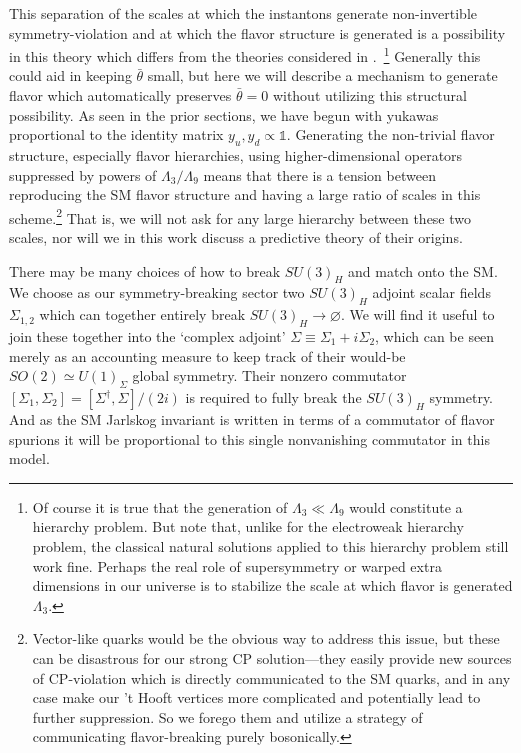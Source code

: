 \documentclass[11pt,a4paper]{article}
\begin{document}
This separation of the scales at which the instantons generate non-invertible symmetry-violation and at which the flavor structure is generated is a possibility in this theory which differs from the theories considered in \cite{Agrawal:2017evu,Agrawal:2017ksf}.~\footnote{Of course it is true that the generation of $\Lambda_3 \ll \Lambda_9$ would constitute a hierarchy problem. But note that, unlike for the electroweak hierarchy problem, the classical natural solutions applied to this hierarchy problem still work fine. Perhaps the real role of supersymmetry or warped extra dimensions in our universe is to stabilize the scale at which flavor is generated $\Lambda_3$.} 
Generally this could aid in keeping $\bar \theta$ small, but here we will describe a mechanism to generate flavor which automatically preserves $\bar \theta = 0$ without utilizing this structural possibility. 
As seen in the prior sections, we have begun with yukawas proportional to the identity matrix $y_u, y_d \propto \mathds{1}$. Generating the non-trivial flavor structure, especially flavor hierarchies, using higher-dimensional operators suppressed by powers of $\Lambda_3 / \Lambda_9$ means that there is a tension between reproducing the SM flavor structure and having a large ratio of scales in this scheme.\footnote{Vector-like quarks would be the obvious way to address this issue, but these can be disastrous for our strong CP solution---they easily provide new sources of CP-violation which is directly communicated to the SM quarks, and in any case make our 't Hooft vertices more complicated and potentially lead to further suppression. So we forego them and utilize a strategy of communicating flavor-breaking purely bosonically.} That is, we will not ask for any large hierarchy between these two scales, nor will we in this work discuss a predictive theory of their origins. 

There may be many choices of how to break $SU(3)_H$ and match onto the SM. 
We choose as our symmetry-breaking sector two $SU(3)_H$ adjoint scalar fields $\Sigma_{1,2}$ which can together entirely break $SU(3)_H \rightarrow \varnothing$. We will find it useful to join these together into the `complex adjoint' $\Sigma \equiv \Sigma_1 + i \Sigma_2$, which can be seen merely as an accounting measure to keep track of their would-be $SO(2)\simeq U(1)_\Sigma$ global symmetry. Their nonzero commutator $\left[\Sigma_1,\Sigma_2\right] = \left[\Sigma^\dagger,\Sigma\right]/(2i)$ is required to fully break the $SU(3)_H$ symmetry. And as the SM Jarlskog invariant is written in terms of a commutator of flavor spurions it will be proportional to this single nonvanishing commutator in this model.
\end{document}
